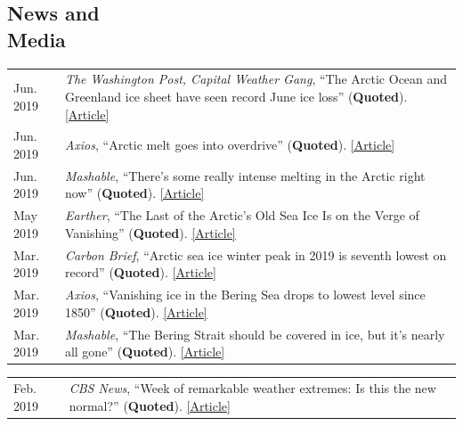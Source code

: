 \documentclass[margin,line,palatino,courier,10pt]{res}
\begin{document}
\begin{resume}
\section{\sc \textcolor{Cerulean}{\large{\textbf{News and\\ Media}}}}
\vspace*{0.04in}
\begin{tabular}{@{}p{0.9in}p{4in}}
Jun. 2019 & \textit{The Washington Post, Capital Weather Gang}, ``The Arctic Ocean and Greenland ice sheet have seen record June ice loss'' (\textbf{Quoted}). \href{https://www.washingtonpost.com/weather/2019/06/14/arctic-ocean-greenland-ice-sheet-have-seen-record-june-ice-loss/?utm_term=.7539db99ca6e}{[Article]}\\
Jun. 2019 & \textit{Axios}, ``Arctic melt goes into overdrive'' (\textbf{Quoted}). \href{https://www.axios.com/newsletters/axios-science-9172185b-a9a1-498f-9014-4ee04e1ff826.html?chunk=3#story3}{[Article]}\\
Jun. 2019 & \textit{Mashable}, ``There's some really intense melting in the Arctic right now'' (\textbf{Quoted}). \href{https://mashable.com/article/arctic-melting-records/}{[Article]}\\
May 2019 & \textit{Earther}, ``The Last of the Arctic's Old Sea Ice Is on the Verge of Vanishing'' (\textbf{Quoted}). \href{https://earther.gizmodo.com/the-last-of-the-arctics-old-sea-ice-is-on-the-verge-of-1834510753}{[Article]}\\
Mar. 2019 & \textit{Carbon Brief}, ``Arctic sea ice winter peak in 2019 is seventh lowest on record'' (\textbf{Quoted}). \href{https://www.carbonbrief.org/arctic-sea-ice-winter-peak-in-2019-is-seventh-lowest-on-record}{[Article]}\\
Mar. 2019 & \textit{Axios}, ``Vanishing ice in the Bering Sea drops to lowest level since 1850'' (\textbf{Quoted}). \href{https://www.axios.com/bering-sea-ice-vanishing-a23bacda-a08d-4ec7-9124-419b90b984a2.html}{[Article]}\\
Mar. 2019 &\textit{Mashable}, ``The Bering Strait should be covered in ice, but it's nearly all gone'' (\textbf{Quoted}). \href{https://mashable.com/article/bering-strait-sea-ice-gone-2019-arctic/#zs3hdvbg3mqc}{[Article]}\\
\end{tabular}
\begin{tabular}{@{}p{0.9in}p{4in}}
Feb. 2019 & \textit{CBS News}, ``Week of remarkable weather extremes: Is this the new normal?'' (\textbf{Quoted}). \href{https://www.cbsnews.com/news/remarkable-weather-extremes-is-this-the-new-normal-climate-change/?ftag=CNM-00-10aab7e&linkId=64169123}{[Article]}\\

\end{tabular}
\end{resume}
\end{document}
